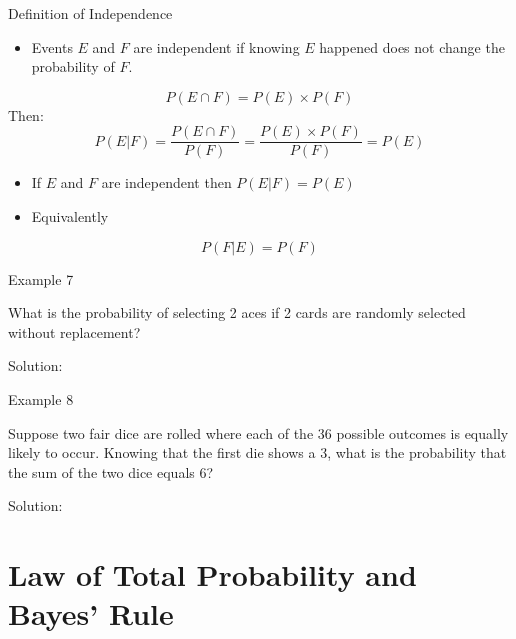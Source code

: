 \documentclass[
  ignorenonframetext,
]{beamer}
\providecommand{\tightlist}{%
  \setlength{\itemsep}{0pt}\setlength{\parskip}{0pt}}
\begin{document}
\begin{frame}{Definition of Independence}
\protect\hypertarget{definition-of-independence}{}
\begin{itemize}
\tightlist
\item
  Events \(E\) and \(F\) are independent if knowing \(E\) happened does
  not change the probability of \(F\).
\end{itemize}

\[P( E \cap  F)=P( E)\times P( F)\] Then:
\[P( E|  F)=\frac{P( E \cap  F)}{P( F)}=\frac{P( E)\times P( F)}{P( F)}=P( E)\]

\begin{itemize}
\item
  If \(E\) and \(F\) are independent then \(P( E| F)=P( E)\)
\item
  Equivalently
\end{itemize}

\[P(F|E)=P( F)\]
\end{frame}

\begin{frame}{Example 7}
\protect\hypertarget{example-7}{}
\begin{tcolorbox}
What is the probability of selecting 2 aces if 2 cards are randomly selected without replacement?
\end{tcolorbox}

\begin{tcolorbox}
Solution:


\vspace{30mm}

\end{tcolorbox}
\end{frame}

\begin{frame}{Example 8}
\protect\hypertarget{example-8}{}
\begin{tcolorbox}
Suppose two fair dice are rolled where each of the 36 possible outcomes is equally likely to occur. Knowing that the first die shows a 3, what is the probability that the sum of the two dice equals 6?
\end{tcolorbox}

\begin{tcolorbox}
Solution: 

\vspace{30mm}


\end{tcolorbox}
\end{frame}

\hypertarget{law-of-total-probability-and-bayes-rule}{%
\section{Law of Total Probability and Bayes'
Rule}\label{law-of-total-probability-and-bayes-rule}}
\end{document}
